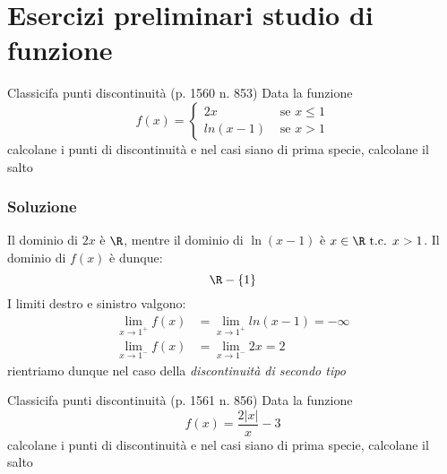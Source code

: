 \section{Esercizi preliminari studio di funzione}
\begin{esercizio}{Classicifa punti discontinuità (p. 1560 n. 853)}
	Data la funzione
	\[
		f\left(x\right) =
		\begin{cases}
			2x                 & \text{ se } x \le 1 \\
			ln\left(x-1\right) & \text{ se } x > 1
		\end{cases}
	\]
	calcolane i punti di discontinuità e nel casi siano di prima specie, calcolane il salto
\end{esercizio}

\subsubsection*{Soluzione}
Il dominio di $ 2x $ è $ \R  $, mentre il dominio di $ \ln\left(x-1\right) $ è $ {x \in \R \text{ t.c. } x > 1} $. Il dominio di $ f\left(x\right) $ è dunque:
\[
	\R - \left\{1\right\}
\]
\vskip3mm
I limiti destro e sinistro valgono:
\begin{align*}
	\lim_{x \to 1^{+}} f(x) & = \lim_{x \to 1^{+}} ln\left(x-1\right) = -\infty \\
	\lim_{x \to 1^{-}} f(x) & = \lim_{x \to 1^{-}} 2x = 2
\end{align*}
rientriamo dunque nel caso della \textit{discontinuità di secondo tipo}



\begin{esercizio}{Classicifa punti discontinuità (p. 1561 n. 856)}
	Data la funzione
	\[
		f\left(x\right) = \frac{2 \left|x\right|}{x} -3
	\]
	calcolane i punti di discontinuità e nel casi siano di prima specie, calcolane il salto
\end{esercizio}


